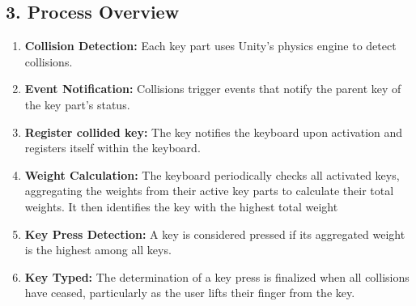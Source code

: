 \subsection*{3. Process Overview}
\begin{enumerate}
    \item \textbf{Collision Detection:} Each key part uses Unity's physics engine to detect collisions.
    \item \textbf{Event Notification:} Collisions trigger events that notify the parent key of the key part's status.
       \item \textbf{Register collided key:}
    The key notifies the keyboard upon activation and registers itself within the keyboard.
       
    \item \textbf{Weight Calculation:} The keyboard periodically checks all activated keys, aggregating the weights from their active key parts to calculate their total weights. It then identifies the key with the highest total weight
    
    \item \textbf{Key Press Detection:} A key is considered pressed if its aggregated weight is the highest among all keys.
    \item \textbf{Key Typed:} The determination of a key press is finalized when all collisions have ceased, particularly as the user lifts their finger from the key.
\end{enumerate}




















